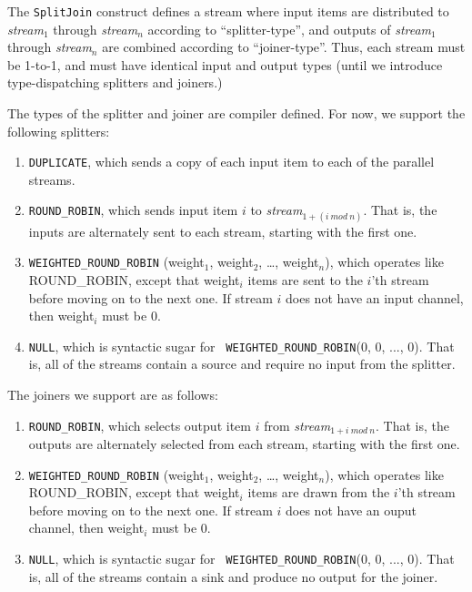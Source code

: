 \documentclass[draft]{article}
\begin{document}
The {\tt SplitJoin} construct defines a stream where input items are
distributed to {\it stream$_1$} through {\it stream$_n$} according to
``splitter-type'', and outputs of {\it stream$_1$} through {\it
stream$_n$} are combined according to ``joiner-type''.  Thus, each
stream must be 1-to-1, and must have identical input and output types
(until we introduce type-dispatching splitters and joiners.)

The types of the splitter and joiner are compiler defined.  For now,
we support the following splitters:

\begin{enumerate}

\item {\tt DUPLICATE}, which sends a copy of each input item to each
of the parallel streams.

\item {\tt ROUND\_ROBIN}, which sends input item $i$ to {\it
stream$_{1+(i~mod~n)}$}.  That is, the inputs are alternately sent to
each stream, starting with the first one.

\item {\tt WEIGHTED\_ROUND\_ROBIN} (weight$_1$, weight$_2$, \dots,
weight$_n$), which operates like ROUND\_ROBIN, except that weight$_i$
items are sent to the $i$'th stream before moving on to the next one.
If stream $i$ does not have an input channel, then weight$_i$ must be
0.

\item {\tt NULL}, which is syntactic sugar for {\tt
WEIGHTED\_ROUND\_ROBIN}(0, 0, ..., 0).  That is, all of the streams
contain a source and require no input from the splitter.

\end{enumerate}

The joiners we support are as follows:

\begin{enumerate}

\item {\tt ROUND\_ROBIN}, which selects output item $i$ from {\it
stream$_{1+i~mod~n}$}.  That is, the outputs are alternately selected
from each stream, starting with the first one.

\item {\tt WEIGHTED\_ROUND\_ROBIN} (weight$_1$, weight$_2$, \dots,
weight$_n$), which operates like ROUND\_ROBIN, except that weight$_i$
items are drawn from the $i$'th stream before moving on to the next
one.  If stream $i$ does not have an ouput channel, then weight$_i$
must be 0.

\item {\tt NULL}, which is syntactic sugar for {\tt
WEIGHTED\_ROUND\_ROBIN}(0, 0, ..., 0).  That is, all of the streams
contain a sink and produce no output for the joiner.

\end{enumerate}
\end{document}
